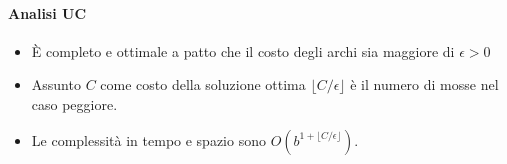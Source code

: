 \paragraph{Analisi UC}
\begin{itemize}
	\item \`E completo e ottimale a patto che il costo degli archi sia maggiore di
	      $\epsilon > 0$
	\item Assunto $C$ come costo della soluzione ottima $\lfloor C/\epsilon \rfloor$ \`e
	      il numero di mosse nel caso peggiore.
	\item Le complessit\`a in tempo e spazio sono $O(b^{1+\lfloor C/\epsilon \rfloor})$.
\end{itemize}